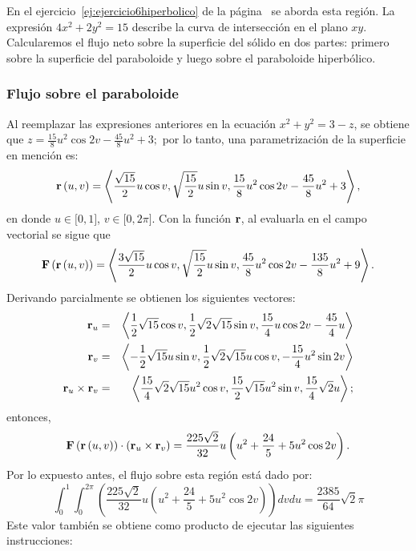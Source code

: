 \begin{parrafonumerado}
En el ejercicio~\ref{ej:ejercicio6hiperbolico} de la página~\pageref{ej:ejercicio6hiperbolico}
se aborda esta región.
La expresión $4x^{2}+2y^{2}=15$ describe la curva de intersección en el plano $xy$. \textls[-10]{Esta región puede representarse mediante las expresiones
$x=\frac{\sqrt{15}}{2}u\cos v$, $y=\sqrt{\frac{15}{2}}u\sin v$, con $u\in \lbrack 0,1]$, $v\in \lbrack 0,2\pi ]$.}
Calcularemos el flujo neto sobre la superficie del sólido en dos partes: primero sobre la superficie del paraboloide y luego sobre el paraboloide hiperbólico.

\subsubsection{Flujo sobre el paraboloide}

Al reemplazar las expresiones anteriores en la ecuación $x^2+y^2=3-z$, se obtiene que
$z=\frac{15}{8}u^{2}\cos 2v-\frac{45}{8}u^{2}+3;$
por lo tanto, una parametrización de la superficie en mención es:
\[{\bf r}\left( u,v\right) =\left\langle \frac{\sqrt{15}}{2}u\cos v,\sqrt{\frac{15}{2}}u\sin v,
\frac{15}{8}u^{2}\cos 2v-\frac{45}{8}u^{2}+3\right\rangle,\]
en donde $u\in \lbrack 0,1]$, $v\in \lbrack 0,2\pi ]$.
Con la función ${\bf r}$, al evaluarla en el campo vectorial se sigue que
\[{\bf F}\left({\bf r}\left( u,v\right) \right) =\left\langle \frac{3\sqrt{15}}{2}u\cos v,\sqrt{\frac{15}{2}}u\sin v,\frac{45}{8}u^{2}\cos 2v-\frac{135}{8}u^{2}+9\right\rangle.\]
Derivando parcialmente se obtienen los siguientes vectores:
\begin{eqnarray*}
{\bf r}_{u} &=&\left\langle \frac{1}{2}\sqrt{15}\cos v,\frac{1}{2}\sqrt{2}\sqrt{15}%
\sin v,\frac{15}{4}u\cos 2v-\frac{45}{4}u \right\rangle \\
{\bf r}_{v}&=& \left\langle -\frac{1}{2}\sqrt{15}u\sin v,\frac{1}{2}\sqrt{2}\sqrt{15}u\cos v,-\frac{15}{4}u^{2}\sin 2v \right\rangle \\
{\bf r}_{u}\times {\bf r}_{v}&=&\left\langle \frac{15}{4}\sqrt{2}\sqrt{15}u^{2}\cos v,\frac{15}{2}\sqrt{15}u^{2}\sin v,\frac{15}{4}\sqrt{2}u\right\rangle;
\end{eqnarray*}
entonces,
\[{\bf F}\left({\bf r}\left(u,v\right) \right) \cdot \left({\bf r}_{u}\times {\bf r}_{v}\right) =\frac{225\sqrt{2}}{32}u\left( u^{2}+\frac{24}{5}+5u^{2}\cos 2v\right).\]
Por lo expuesto antes, el flujo sobre esta región está dado por:
\begin{equation}\label{flujo5}
\int_{0}^{1}\int_{0}^{2\pi }\left( \frac{225\sqrt{2}}{32}u\left( u^{2}+ \frac{24}{5}+5u^{2}\cos 2v\right) \right) dvdu= \frac{2385}{64}\sqrt{2}\pi
\end{equation}
Este valor también se obtiene como producto de ejecutar las siguientes instrucciones:


\end{parrafonumerado}
